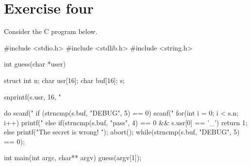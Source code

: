 \section{Exercise four}

Consider the C program below.
\begin{verbnobox}[\verbarg]
#include <stdio.h>
#include <stdlib.h>
#include <string.h>

int guess(char *user) {
    struct {
        int n;
        char usr[16];
        char buf[16];
    } s;

    snprintf(s.usr, 16, "%

    do {
        scanf("%
        if (strncmp(s.buf, "DEBUG", 5) == 0) {
            scanf("%
            for(int i = 0; i < s.n; i++) {
                printf("%
            }
        } else {
            if(strncmp(s.buf, "pass", 4) == 0 && s.usr[0] == '_') {
                return 1;
            } else {
                printf("The secret is wrong! \n");
                abort();
                }
        }
    } while(strncmp(s.buf, "DEBUG", 5) == 0);
}

int main(int argc, char** argv) {
    guess(argv[1]);
}
\end{verbnobox}


